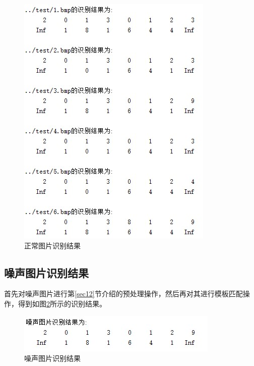 \documentclass[cn]{elegantbook}
\begin{document}
\begin{figure}[!h]
	\centering
	\includegraphics[width=\textwidth]{res4}
	\caption{\label{res4}正常图片识别结果}
\end{figure}

\subsection{噪声图片识别结果}
首先对噪声图片进行第\ref{sec12}节介绍的预处理操作，然后再对其进行模板匹配操作，得到如图\ref{res5}所示的识别结果。

\begin{figure}[!h]
	\centering
	\includegraphics[width=\textwidth]{res5}
	\caption{\label{res5}噪声图片识别结果}
\end{figure}
\end{document}

